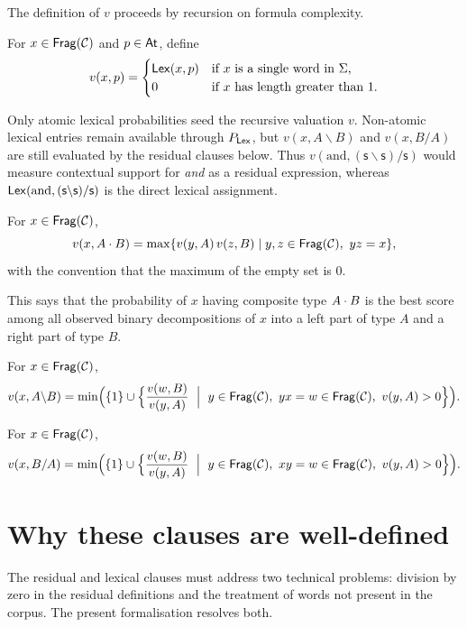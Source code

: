 The definition of $v$ proceeds by recursion on formula complexity.

\begin{definition}
For $x \in \mathsf{Frag}(\mathcal C)$ and $p \in \mathsf{At}$, define
\[
v(x,p) =
\begin{cases}
\mathsf{Lex}(x,p) & \text{if $x$ is a single word in $\Sigma$,}\\
0 & \text{if $x$ has length greater than $1$.}
\end{cases}
\]
\end{definition}

Only atomic lexical probabilities seed the recursive valuation $v$. Non-atomic lexical entries
remain available through $P_{\mathsf{Lex}}$, but $v(x,A\backslash B)$ and $v(x,B/A)$ are still evaluated
by the residual clauses below. Thus $v(\text{and},(\mathsf{s}\backslash \mathsf{s})/\mathsf{s})$
would measure contextual support for \emph{and} as a residual expression, whereas
$\mathsf{Lex}(\text{and},(\mathsf{s}\backslash \mathsf{s})/\mathsf{s})$ is the direct lexical assignment.

\begin{definition}[Product]
For $x \in \mathsf{Frag}(\mathcal C)$,
\[
v(x,A\mathbin{\cdot} B)
= \max\{v(y,A)\,v(z,B) \mid y,z \in \mathsf{Frag}(\mathcal C),\ yz=x\},
\]
with the convention that the maximum of the empty set is $0$.
\end{definition}

This says that the probability of $x$ having composite type $A\mathbin{\cdot} B$ is the best score among
all observed binary decompositions of $x$ into a left part of type $A$ and a right part of type
$B$.

\begin{definition}
For $x \in \mathsf{Frag}(\mathcal C)$,
\[
v(x,A\backslash B)
= \min\Bigl(\{1\} \cup
\Bigl\{\frac{v(w,B)}{v(y,A)}
\ \Bigm|\ y \in \Frag(\mathcal C),\ yx=w \in \Frag(\mathcal C),\ v(y,A)>0\Bigr\}\Bigr).
\]
\end{definition}

\begin{definition}
For $x \in \mathsf{Frag}(\mathcal C)$,
\[
v(x,B/A)
= \min\Bigl(\{1\} \cup
\Bigl\{\frac{v(w,B)}{v(y,A)}
\ \Bigm|\ y \in \Frag(\mathcal C),\ xy=w \in \Frag(\mathcal C),\ v(y,A)>0\Bigr\}\Bigr).
\]
\end{definition}


\section{Why these clauses are well-defined}
The residual and lexical clauses must address two technical problems: division by zero in the
residual definitions and the treatment of words not present in the corpus. The present
formalisation resolves both.

